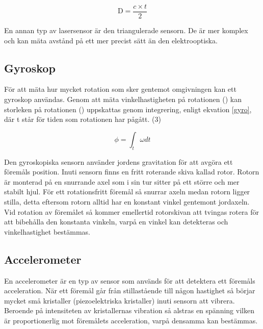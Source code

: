 \documentclass[11pt]{article}
\begin{document}
\begin{flushleft}
\begin{equation}\label{laser_eq}
	\textrm{D} = \frac {c \times t}{2}						
\end{equation}

En annan typ av lasersensor är den triangulerade sensorn. De är mer komplex och kan mäta avstånd på ett mer precist sätt än den elektrooptiska. \cite{website:mti}

\subsection{Gyroskop}
För att mäta hur mycket rotation som sker gentemot omgivningen kan ett gyroskop användas. Genom att mäta vinkelhastigheten på rotationen (\textomega) kan storleken på rotationen (\straightphi) uppskattas genom integrering, enligt ekvation \ref{gyro}, där t står för tiden som rotationen har pågått. (3)

\begin{equation}\label{gyro}
	\phi = \int_{t}^{ }\omega dt 						
\end{equation}

Den gyroskopiska sensorn använder jordens gravitation för att avgöra ett föremåls position. Inuti sensorn finns en fritt roterande skiva kallad rotor. Rotorn är monterad på en snurrande axel som i sin tur sitter på ett större och mer stabilt hjul. För ett rotationsfritt föremål så snurrar axeln medan rotorn ligger stilla, detta eftersom rotorn alltid har en konstant vinkel gentemont jordaxeln. Vid rotation av föremålet så kommer emellertid rotorskivan att tvingas rotera för att bibehålla den konstanta vinkeln, varpå en vinkel kan detekteras och vinkelhastighet bestämmas.

\subsection{Accelerometer}
En accelerometer är en typ av sensor som används för att detektera ett föremåls acceleration. När ett föremål går från stillastående till någon hastighet så börjar mycket små kristaller (piezoelektriska kristaller) inuti sensorn att vibrera. Beroende på intensiteten av kristallernas vibration så alstras en spänning vilken är proportionerlig mot föremålets acceleration, varpå densamma kan bestämmas.





\end{flushleft}
\end{document}
